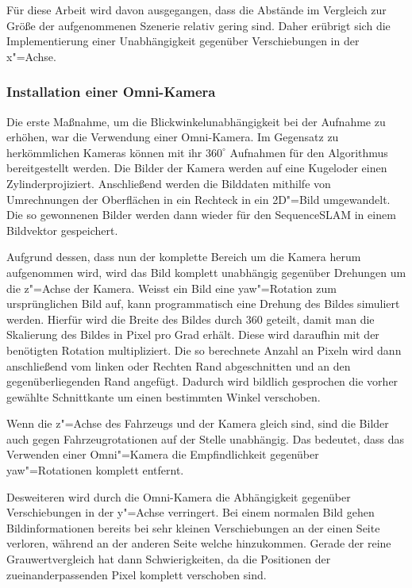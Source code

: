 \documentclass[12pt,a4paper,titlepage]{scrartcl}
\begin{document}
Für diese Arbeit wird davon ausgegangen, dass die Abstände im Vergleich zur Größe der aufgenommenen Szenerie relativ gering sind. Daher erübrigt sich die Implementierung einer Unabhängigkeit gegenüber Verschiebungen in der x"=Achse.
\subsubsection{Installation einer Omni-Kamera}
Die erste Maßnahme, um die Blickwinkelunabhängigkeit bei der Aufnahme zu erhöhen, war die Verwendung einer Omni-Kamera. Im Gegensatz zu herkömmlichen Kameras können mit ihr $360^\circ$ Aufnahmen für den Algorithmus bereitgestellt werden. Die Bilder der Kamera werden auf eine \glqq Kugel\grqq{ }oder einen \glqq Zylinder\grqq{ }projiziert. Anschließend werden die Bilddaten mithilfe von Umrechnungen der Oberflächen in ein Rechteck in ein 2D"=Bild umgewandelt. Die so gewonnenen Bilder werden dann wieder für den SequenceSLAM in einem Bildvektor gespeichert.

Aufgrund dessen, dass nun der komplette Bereich um die Kamera herum aufgenommen wird, wird das Bild komplett unabhängig gegenüber Drehungen um die z"=Achse der Kamera. Weisst ein Bild eine yaw"=Rotation zum ursprünglichen Bild auf, kann programmatisch eine Drehung des Bildes simuliert werden. Hierfür wird die Breite des Bildes durch $360$ geteilt, damit man die Skalierung des Bildes in Pixel pro Grad erhält. Diese wird daraufhin mit der benötigten Rotation multipliziert. Die so berechnete Anzahl an Pixeln wird dann anschließend vom linken oder Rechten Rand abgeschnitten und an den gegenüberliegenden Rand angefügt. Dadurch wird bildlich gesprochen die vorher gewählte Schnittkante um einen bestimmten Winkel verschoben.

Wenn die z"=Achse des Fahrzeugs und der Kamera gleich sind, sind die Bilder auch gegen Fahrzeugrotationen auf der Stelle unabhängig. Das bedeutet, dass das Verwenden einer Omni"=Kamera die Empfindlichkeit gegenüber yaw"=Rotationen komplett entfernt. 

Desweiteren wird durch die Omni-Kamera die Abhängigkeit gegenüber Verschiebungen in der y"=Achse verringert. Bei einem normalen Bild gehen Bildinformationen bereits bei sehr kleinen Verschiebungen an der einen Seite verloren, während an der anderen Seite welche hinzukommen. Gerade der reine Grauwertvergleich hat dann Schwierigkeiten, da die Positionen der zueinanderpassenden Pixel komplett verschoben sind. 
\end{document}
